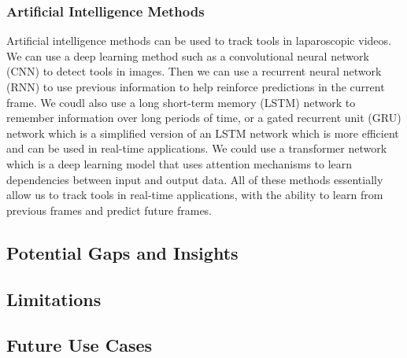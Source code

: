 \subsubsection{Artificial Intelligence Methods}

Artificial intelligence methods can be used to track tools in laparoscopic videos. We can use a deep learning method such as a convolutional neural network (CNN) to detect tools in images. Then we can use a recurrent neural network (RNN) to use previous information to help reinforce predictions in the current frame. We coudl also use a long short-term memory (LSTM) network to remember information over long periods of time, or a gated recurrent unit (GRU) network which is a simplified version of an LSTM network which is more efficient and can be used in real-time applications. We could use a transformer network which is a deep learning model that uses attention mechanisms to learn dependencies between input and output data. 
All of these methods essentially allow us to track tools in real-time applications, with the ability to learn from previous frames and predict future frames.

\subsection{Potential Gaps and Insights}


\subsection{Limitations}

\subsection{Future Use Cases}

